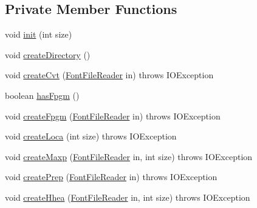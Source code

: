 \subsection*{Private Member Functions}
\begin{DoxyCompactItemize}
\item 
void \mbox{\hyperlink{classorg_1_1newdawn_1_1slick_1_1tools_1_1hiero_1_1truetype_1_1_t_t_f_sub_set_file_a6c3025b00ec1c60907f23d2132027d60}{init}} (int size)
\item 
void \mbox{\hyperlink{classorg_1_1newdawn_1_1slick_1_1tools_1_1hiero_1_1truetype_1_1_t_t_f_sub_set_file_a410411e8e19e7eaae92852399b2999bc}{create\+Directory}} ()
\item 
void \mbox{\hyperlink{classorg_1_1newdawn_1_1slick_1_1tools_1_1hiero_1_1truetype_1_1_t_t_f_sub_set_file_ae655faae5dece42b491744589122b1ea}{create\+Cvt}} (\mbox{\hyperlink{classorg_1_1newdawn_1_1slick_1_1tools_1_1hiero_1_1truetype_1_1_font_file_reader}{Font\+File\+Reader}} in)  throws I\+O\+Exception 
\item 
boolean \mbox{\hyperlink{classorg_1_1newdawn_1_1slick_1_1tools_1_1hiero_1_1truetype_1_1_t_t_f_sub_set_file_a981de0e4b90373975c4590ae4cd0b33d}{has\+Fpgm}} ()
\item 
void \mbox{\hyperlink{classorg_1_1newdawn_1_1slick_1_1tools_1_1hiero_1_1truetype_1_1_t_t_f_sub_set_file_aaac00529b3dc804ca7cfde3b330e0bce}{create\+Fpgm}} (\mbox{\hyperlink{classorg_1_1newdawn_1_1slick_1_1tools_1_1hiero_1_1truetype_1_1_font_file_reader}{Font\+File\+Reader}} in)  throws I\+O\+Exception 
\item 
void \mbox{\hyperlink{classorg_1_1newdawn_1_1slick_1_1tools_1_1hiero_1_1truetype_1_1_t_t_f_sub_set_file_af01c5f651caad08d431324bc69b388c9}{create\+Loca}} (int size)  throws I\+O\+Exception 
\item 
void \mbox{\hyperlink{classorg_1_1newdawn_1_1slick_1_1tools_1_1hiero_1_1truetype_1_1_t_t_f_sub_set_file_a8c4bd8885ccc2b53ee44076cea3141f1}{create\+Maxp}} (\mbox{\hyperlink{classorg_1_1newdawn_1_1slick_1_1tools_1_1hiero_1_1truetype_1_1_font_file_reader}{Font\+File\+Reader}} in, int size)  throws I\+O\+Exception 
\item 
void \mbox{\hyperlink{classorg_1_1newdawn_1_1slick_1_1tools_1_1hiero_1_1truetype_1_1_t_t_f_sub_set_file_a76a697ec413ae68666ea0792fac1aa12}{create\+Prep}} (\mbox{\hyperlink{classorg_1_1newdawn_1_1slick_1_1tools_1_1hiero_1_1truetype_1_1_font_file_reader}{Font\+File\+Reader}} in)  throws I\+O\+Exception 
\item 
void \mbox{\hyperlink{classorg_1_1newdawn_1_1slick_1_1tools_1_1hiero_1_1truetype_1_1_t_t_f_sub_set_file_ad1f5466a315f2f689b310f1651953f6b}{create\+Hhea}} (\mbox{\hyperlink{classorg_1_1newdawn_1_1slick_1_1tools_1_1hiero_1_1truetype_1_1_font_file_reader}{Font\+File\+Reader}} in, int size)  throws I\+O\+Exception 

\end{DoxyCompactItemize}
